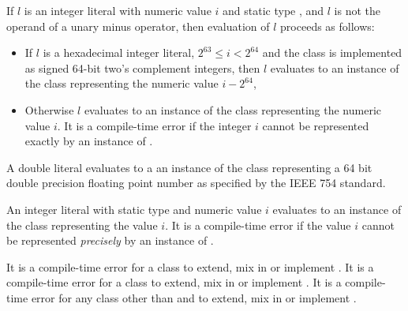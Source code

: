 \documentclass[makeidx]{article}
\begin{document}
{\LMHash{}%
If $l$ is an integer literal with numeric value $i$ and static type ,
and $l$ is not the operand of a unary minus operator,
then evaluation of $l$ proceeds as follows:
\begin{itemize}
  \item{} If $l$ is a hexadecimal integer literal,
  $2^{63} \le i < 2^{64}$ and the  class is implemented as
  signed 64-bit two's complement integers,
  then $l$ evaluates to an instance of the  class
  representing the numeric value $i - 2^{64}$,
  \item{} Otherwise $l$ evaluates to an instance of the  class
  representing the numeric value $i$.
  It is a compile-time error if the integer $i$ cannot be represented
  exactly by an instance of .
\end{itemize}


\LMHash{}%
A double literal evaluates to a an instance of the  class
representing a 64 bit double precision floating point number
as specified by the IEEE 754 standard.

\LMHash{}%
An integer literal with static type  and numeric value $i$
evaluates to an instance of the  class representing the value $i$.
It is a compile-time error if the value $i$
cannot be represented \emph{precisely} by an instance of .


\LMHash{}%
It is a compile-time error for a class to extend, mix in or implement
.
It is a compile-time error for a class to extend, mix in or implement
.
It is a compile-time error for any class
other than  and  to extend, mix in or implement
.

}
\end{document}
